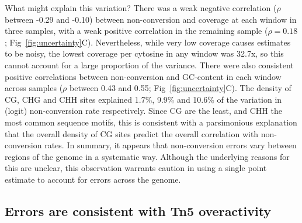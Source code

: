 \documentclass[10pt,draft,letterpaper]{article}
\begin{document}
\begin{figure*}
  \begin{center}
    \caption{
        {\bf Non-conversion errors vary at the kilobase scale.}
        Cytosine non-conversion across the first half of the chloroplast in four independent replicate library preparations of the \emph{A.~thaliana} accession Col-0.
        Colours denote independent libraries.
        (A) 150~bp windows across the chloroplast.
        (B) Relationship between non-conversion and coverage per base.
        (C) Relationship between non-conversion and GC content.
    }
    \label{fig:uncertainty}
  \end{center}
\end{figure*}

What might explain this variation?
There was a weak negative correlation ($\rho$ between -0.29 and -0.10) between non-conversion and coverage at each window in three samples, with a weak positive correlation in the remaining sample ($\rho = 0.18$; Fig~\ref{fig:uncertainty}C).
Nevertheless, while very low coverage causes estimates to be noisy, the lowest coverage per cytosine in any window was 32.7x, so this cannot account for a large proportion of the variance.
There were also consistent positive correlations between non-conversion and GC-content in each window across samples ($\rho$ between 0.43 and 0.55; Fig~\ref{fig:uncertainty}C).
The density of CG, CHG and CHH sites explained 1.7\%, 9.9\% and 10.6\% of the variation in (logit) non-conversion rate respectively.
Since CG are the least, and CHH the most common sequence motifs, this is consistent with a parsimonious explanation that the overall density of CG sites predict the overall correlation with non-conversion rates.
In summary, it appears that non-conversion errors vary between regions of the genome in a systematic way.
Although the underlying reasons for this are unclear, this observation warrants caution in using a single point estimate to account for errors across the genome.

\subsection*{Errors are consistent with Tn5 overactivity}
\end{document}
